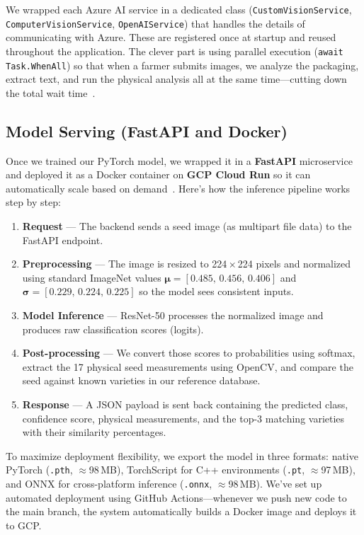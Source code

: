 We wrapped each Azure AI service in a dedicated class (\texttt{CustomVisionService},
\texttt{ComputerVisionService}, \texttt{OpenAIService}) that handles the details
of communicating with Azure. These are registered once at startup and reused
throughout the application. The clever part is using parallel execution
(\texttt{await Task.WhenAll}) so that when a farmer submits images, we analyze
the packaging, extract text, and run the physical analysis all at the same
time—cutting down the total wait time~\cite{microsoft2023aspnet}.

\subsection{Model Serving (FastAPI and Docker)}

Once we trained our PyTorch model, we wrapped it in a \textbf{FastAPI}
microservice and deployed it as a Docker container on \textbf{GCP Cloud Run}
so it can automatically scale based on demand~\cite{fastapi2023docs}. Here's
how the inference pipeline works step by step:

\begin{enumerate}
  \item \textbf{Request} — The backend sends a seed image (as multipart file data)
        to the FastAPI endpoint.
  \item \textbf{Preprocessing} — The image is resized to 224\,×\,224 pixels
        and normalized using standard ImageNet values
        $\boldsymbol{\mu} = [0.485,\,0.456,\,0.406]$ and
        $\boldsymbol{\sigma} = [0.229,\,0.224,\,0.225]$ so the model sees
        consistent inputs.
  \item \textbf{Model Inference} — ResNet-50 processes the normalized image
        and produces raw classification scores (logits).
  \item \textbf{Post-processing} — We convert those scores to probabilities
        using softmax, extract the 17 physical seed measurements using OpenCV,
        and compare the seed against known varieties in our reference database.
  \item \textbf{Response} — A JSON payload is sent back containing the predicted
        class, confidence score, physical measurements, and the top-3 matching
        varieties with their similarity percentages.
\end{enumerate}

To maximize deployment flexibility, we export the model in three formats: native
PyTorch (\texttt{.pth}, ${\approx}$98\,MB), TorchScript for C++ environments
(\texttt{.pt}, ${\approx}$97\,MB), and ONNX for cross-platform inference
(\texttt{.onnx}, ${\approx}$98\,MB). We've set up automated deployment using
GitHub Actions—whenever we push new code to the main branch, the system
automatically builds a Docker image and deploys it to GCP.

